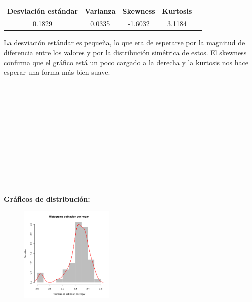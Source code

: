 \documentclass[11pt]{article}
\begin{document}
\begin{center}
\begin{tabular}{|c|c|c|c|c|}
    \hline
    Desviación estándar  & Varianza & Skewness & Kurtosis\\ \hline
    0.1829 & 0.0335 & -1.6032 & 3.1184\\
    \hline
\end{tabular}
\end{center}

La desviación estándar es pequeña, lo que era de esperarse por la magnitud de diferencia entre los valores y por la distribución simétrica de estos. El skewness confirma que el gráfico está un poco cargado a la derecha y la kurtosis nos hace esperar una forma más bien suave.
\\
\\
\\
\\
\\
\\
\\
\\
\\
\\
\\
\\
\\
\textbf{Gráficos de distribución:}
\\

\begin{figure}
    \centering
    \includegraphics[width = 0.4\textwidth]{histph}
\end{figure}
\end{document}
